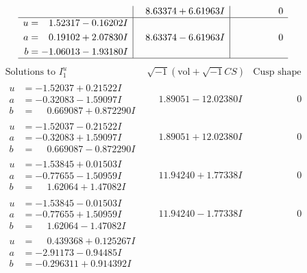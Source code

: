 \documentclass[1p]{elsarticle_modified}
\theoremstyle{definition}
\newcommand{\I}{\sqrt{-1}}
\begin{document}
$$\begin{array}{c|c|c}
 & \phantom{-}8.63374 + 6.61963 I & \phantom{-0.000000 } 0 \\ \hline\begin{aligned}
u &= \phantom{-}1.52317 - 0.16202 I \\
a &= \phantom{-}0.19102 + 2.07830 I \\
b &= -1.06013 - 1.93180 I\end{aligned}
 & \phantom{-}8.63374 - 6.61963 I & \phantom{-0.000000 } 0\\
 \hline 
 \end{array}$$\newpage$$\begin{array}{c|c|c}  
\text{Solutions to }I^u_{1}& \I (\text{vol} + \sqrt{-1}CS) & \text{Cusp shape}\\
 \hline 
\begin{aligned}
u &= -1.52037 + 0.21522 I \\
a &= -0.32083 - 1.59097 I \\
b &= \phantom{-}0.669087 + 0.872290 I\end{aligned}
 & \phantom{-}1.89051 - 12.02380 I & \phantom{-0.000000 } 0 \\ \hline\begin{aligned}
u &= -1.52037 - 0.21522 I \\
a &= -0.32083 + 1.59097 I \\
b &= \phantom{-}0.669087 - 0.872290 I\end{aligned}
 & \phantom{-}1.89051 + 12.02380 I & \phantom{-0.000000 } 0 \\ \hline\begin{aligned}
u &= -1.53845 + 0.01503 I \\
a &= -0.77655 - 1.50959 I \\
b &= \phantom{-}1.62064 + 1.47082 I\end{aligned}
 & \phantom{-}11.94240 + 1.77338 I & \phantom{-0.000000 } 0 \\ \hline\begin{aligned}
u &= -1.53845 - 0.01503 I \\
a &= -0.77655 + 1.50959 I \\
b &= \phantom{-}1.62064 - 1.47082 I\end{aligned}
 & \phantom{-}11.94240 - 1.77338 I & \phantom{-0.000000 } 0 \\ \hline\begin{aligned}
u &= \phantom{-}0.439368 + 0.125267 I \\
a &= -2.91173 - 0.94485 I \\
b &= -0.296311 + 0.914392 I\end{aligned}

\end{array}$$
\end{document}
